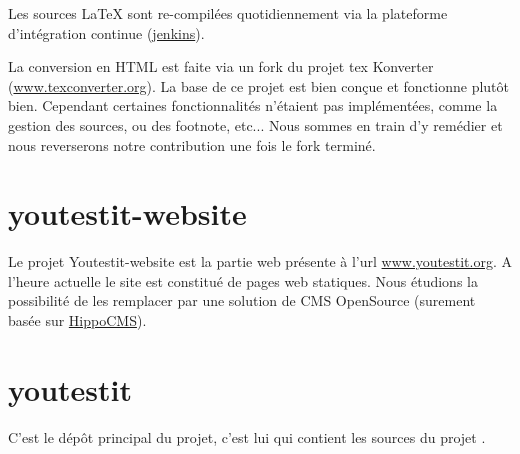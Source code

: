 Les sources LaTeX sont re-compilées  quotidiennement  via la plateforme d'intégration continue (\href{http://youtestit.org/jenkins/job/youtestit-documentation/}{jenkins}).

La conversion en HTML est faite via un fork du projet tex Konverter (\href{http://www.texconverter.org}{www.texconverter.org}). La base de ce projet est bien
conçue et fonctionne plutôt bien. Cependant certaines fonctionnalités n'étaient pas implémentées,
comme la gestion des sources, ou des footnote, etc... Nous sommes en train d'y remédier et nous
reverserons notre contribution une fois le fork terminé. 

\section{youtestit-website}	
Le projet Youtestit-website est la partie web présente à l'url \href{http://www.youtestit.org}{www.youtestit.org}.
A l'heure actuelle le site est constitué de pages web statiques. Nous étudions la possibilité de les
remplacer par une solution de CMS OpenSource (surement basée sur \href{http://www.onehippo.com/en/products/cms}{HippoCMS}). 



\section{youtestit}
C'est le dépôt principal du projet, c'est lui qui contient les sources du projet \youTestIt{}. 





%

%


